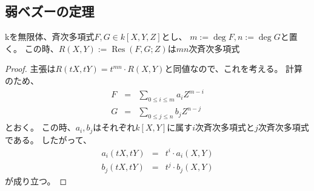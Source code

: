 \documentclass[a4]{article}
\newcommand{\Res}{\operatorname{Res}}
\begin{document}
        \subsection{弱ベズーの定理}
        \begin{Lemma}
            kを無限体、斉次多項式$F,G \in k[X,Y,Z]$とし、
            $m:=\deg F, n:=\deg G$と置く。
            この時、$R(X,Y):=\Res(F,G; Z)$は$mn$次斉次多項式
        \end{Lemma}
        \begin{proof}
            主張は$R(tX,tY)=t^{mn} \cdot R(X,Y)$と同値なので、これを考える。
            計算のため、
            \begin{eqnarray*}
                F&=&\sum_{0 \leq i \leq m}{a_{i} Z^{m-i}} \\
                G&=&\sum_{0 \leq j \leq n}{b_{j} Z^{n-j}}
            \end{eqnarray*}
            とおく。
            この時、$a_{i}, b_{j}$はそれぞれ$k[X,Y]$に属す$i$次斉次多項式と$j$次斉次多項式である。
            したがって、
            \begin{eqnarray*}
                a_{i}(tX,tY)&=&t^{i} \cdot a_{i}(X,Y) \\
                b_{j}(tX,tY)&=&t^{j} \cdot b_{j}(X,Y)
            \end{eqnarray*}
            が成り立つ。


\end{proof}
\end{document}
